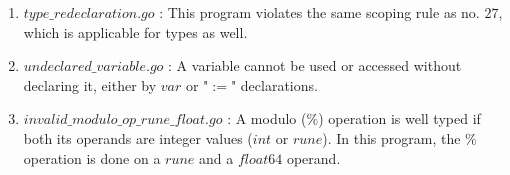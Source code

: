 \documentclass[preprint,12pt]{elsarticle}
\begin{document}
\begin{enumerate}
\item $type\_redeclaration.go$ : This program violates the same scoping rule as no. $27$, which is applicable for types as well.

\item $undeclared\_variable.go$ : A variable cannot be used or accessed without declaring it, either by $var$ or "$:=$" declarations.

\item $invalid\_modulo\_op\_rune\_float.go$ : A modulo ($\%$) operation is well typed if both its operands are integer values ($int$ or $rune$). In this program, the $\%$ operation is done on a $rune$ and a $float64$ operand.
\end{enumerate}






\end{document}
